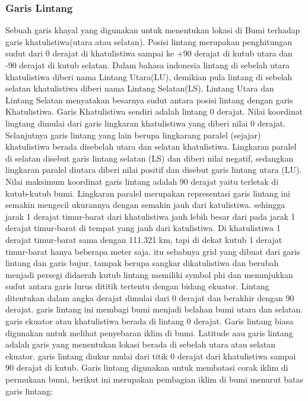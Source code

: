 \subsubsection{Garis Lintang}
Sebuah garis khayal yang digunakan untuk menentukan lokasi di Bumi terhadap garis khatulistiwa(utara atau selatan). Posisi lintang merupakan penghitungan sudut dari 0 derajat di khatulistiwa sampai ke +90 derajat di kutub utara dan -90 derajat di kutub selatan. Dalam bahasa indonesia lintang di sebelah utara khatulistiwa diberi nama Lintang Utara(LU), demikian pula lintang di sebelah selatan khatulistiwa diberi nama Lintang Selatan(LS). Lintang Utara dan Lintang Selatan menyatakan besarnya sudut antara posisi lintang dengan garis Khatulistiwa. Garis Khatulistiwa sendiri adalah lintang 0 derajat. 
Nilai koordinat lingtang dimulai dari garis lingkaran khatulistiwa yang diberi nilai 0 derajat. Selanjutnya garis lintang yang lain berupa lingkarang paralel (sejajar) khatulistiwa berada disebelah utara dan selatan khatulistiwa. Lingkaran paralel di selatan disebut garis lintang selatan (LS) dan diberi nilai negatif, sedangkan lingkaran paralel diutara diberi nilai positif dan disebut garis lintang utara (LU). Nilai maksimum koordinat garis lintang adalah 90 derajat yaitu terletak di kutub-kutub bumi. 
Lingkaran paralel merupakan representasi garis lintang ini semakin mengecil ukurannya dengan semakin jauh dari katulistiwa. sehingga jarak 1 derajat timur-barat dari khatulistiwa jauh lebih besar dari pada jarak 1 derajat timur-barat di tempat yang jauh dari katulistiwa. Di khatulistiwa 1 derajat timur-barat sama dengan 111.321 km, tapi di dekat kutub 1 derajat timur-barat hanya beberapa meter saja. itu sebabnya grid yang dibuat dari garis lintang dan garis bujur, tampak berupa sangkar dikatulistiwa dan berubah menjadi persegi didaerah kutub
lintang memiliki symbol phi dan menunjukkan sudut antara garis lurus dititik tertentu dengan bidang ekuator. Lintang ditentukan dalam angka derajat dimulai dari 0 derajat dan berakhir dengan 90 derajat. garis lintang ini membagi bumi menjadi belahan bumi utara dan selatan. garis ekuator atau khatulistiwa berada di lintang 0 derajat. Garis lintang biasa digunakan untuk melihat penyebaran iklim di bumi.
Latitude aau garis lintang adalah garis yang menentukan lokasi berada di sebelah utara atau selatan ekuator. garis lintang diukur mulai dari titik 0 derajat dari khatulistiwa sampai 90 derajat di kutub. Garis lintang digunakan untuk membatasi corak iklim di permukaan bumi, berikut ini merupakan pembagian iklim di bumi menurut batas garis lintang:
